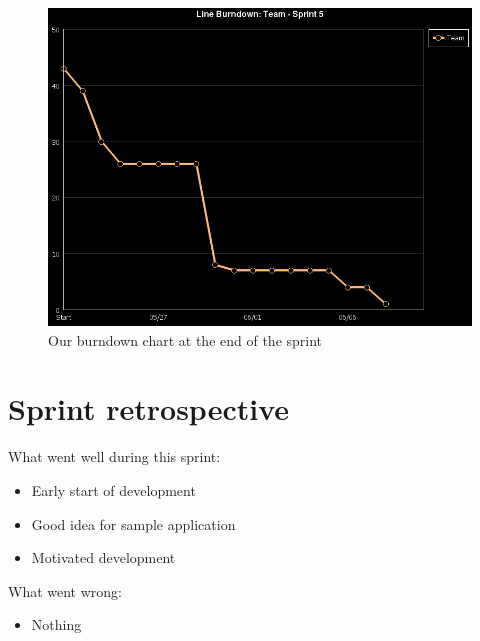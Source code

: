 \documentclass[a4paper,11pt]{article}
\begin{document}
  \begin{figure}[ht!]
  	\begin{center}
  	\includegraphics[width=\textwidth]{line_burndown.png}		
  	\end{center}
  	\caption{Our burndown chart at the end of the sprint}
  	\label{burndown}
  \end{figure}

%
%

\clearpage

\section{Sprint retrospective}

What went well during this sprint:

\begin{itemize}
\item Early start of development
\item Good idea for sample application
\item Motivated development
\end{itemize}

\noindent
What went wrong:
\begin{itemize}
\item Nothing
\end{itemize}
\end{document}
